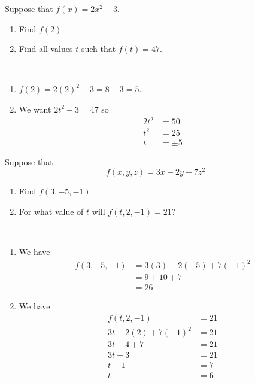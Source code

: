 \begin{exercise}
    Suppose that \( f(x) = 2x^{2}-3 \). 
    \begin{enumerate}[label=\textbf{\roman*)}]
        \item Find \( f(2) \). 
        \item Find all values \( t \) such that \( f(t)=47 \).
    \end{enumerate}
\end{exercise}
\begin{solution}
    $ $ \vspace{-1em}
    \begin{enumerate}[label=\textbf{\roman*)}]
        \item \( f(2) = 2 \left( 2 \right)^{2}-3 = 8-3=5 \).
        \item We want \( 2t^{2}-3=47 \) so 
        \begin{align*}
            2t^{2} &= 50\\
            t^{2} &= 25 \\
            t &= \pm 5
        \end{align*}
    \end{enumerate}
\end{solution}

\begin{exercise}
    Suppose that 
    \[ f \left( x,y,z \right) = 3x - 2y + 7 z^{2} \]
    \begin{enumerate}[label=\textbf{\roman*)}]
        \item Find \( f \left( 3,-5,-1 \right) \)
        \item For what value of \( t \) will \( f \left( t, 2, -1 \right) =21 \)?
    \end{enumerate}
\end{exercise}
\begin{solution}
    $ $ \vspace{-1.5em}
    \begin{enumerate}[label=\textbf{\roman*)}]
        \item We have 
        \begin{align*}
            f \left(  3, -5,-1\right) &= 3 \left( 3 \right) - 2 \left( -5 \right) + 7 \left( -1 \right)^{2} \\
            &= 9 + 10 + 7\\
            &= 26
        \end{align*}
        \item We have 
        \begin{align*}
            f \left( t, 2, -1 \right) &=21  \\
            3t - 2 \left( 2 \right) + 7 \left( -1 \right)^{2} &= 21 \\
            3t -4 + 7 &= 21 \\
            3t + 3 &= 21 \\
            t + 1 &= 7 \\
            t &= 6
        \end{align*}
        
    \end{enumerate}
\end{solution}

